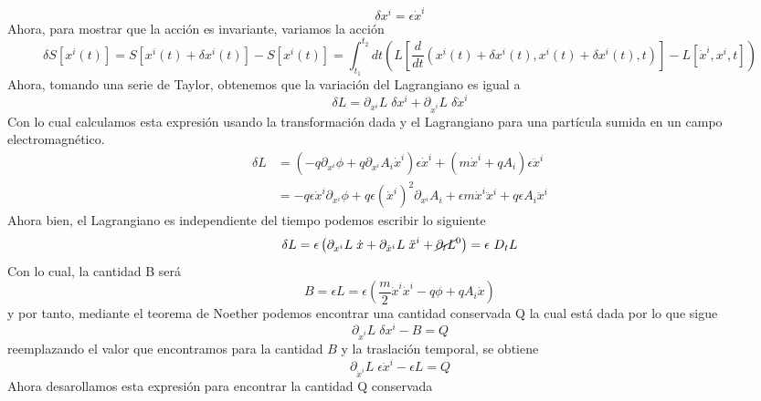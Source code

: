 \documentclass[../main_ej.tex]{subfiles}
\begin{document}
\begin{equation}
  \delta x^i = \epsilon \dot{x}^i 
\end{equation}
Ahora, para mostrar que la acción es invariante, variamos la acción
\begin{equation}
  \delta S[x^i(t)] = S[x^i(t) + \delta x^i(t)] - S[x^i(t)] = \int_{t_1}^{t_2} dt \left(L\left[\frac{d}{dt}(x^i(t)+\delta x^i(t), x^i(t)+\delta x^i(t),t)\right] - L[\dot{x}^i, x^i ,t] \right)
\end{equation}
Ahora, tomando una serie de Taylor, obtenemos que la variación del Lagrangiano es igual a
\begin{equation}
  \delta L = \partial_{x^i}L \;\delta x^i + \partial_{\dot{x}^i} L \; \delta \dot{x}^i
\end{equation}
Con lo cual calculamos esta expresión usando la transformación dada y el Lagrangiano para una partícula sumida en un campo electromagnético.
\begin{align*}
  \delta L  & = \left( -q\partial_{x^i}\phi +q\partial_{x^i}A_i \dot{x}^i \right)\epsilon \dot{x}^i + \left( m\dot{x}^i + qA_i \right)\epsilon\ddot{x}^i \\
  & = -q\epsilon \dot{x}^i\partial_{x^i}\phi + q\epsilon (\dot{x}^i)^2\partial_{x^i}A_i + \epsilon m \dot{x}^i \ddot{x}^i + q \epsilon A_i \ddot{x}^i 
\end{align*}
Ahora bien, el Lagrangiano es independiente del tiempo podemos escribir lo siguiente
\begin{equation*}
  \delta L = \epsilon\left(\partial_{x^i}L \; \dot{x}  + \partial_{\dot{x}^i}L \; \ddot{x}^i + \cancel{\partial_t L }^0\right) = \epsilon\ D_t L
\end{equation*}
Con lo cual, la cantidad B será
\begin{equation*}
  B = \epsilon L = \epsilon \left( \frac{m}{2}\dot{x}^i\dot{x}^i - q\phi + qA_i \dot{x} \right)
\end{equation*}
y por tanto, mediante el teorema de Noether podemos encontrar una cantidad conservada Q la cual está dada por lo que sigue
\begin{equation*}
  \partial_{\dot{x}^i}L \; \delta x^i - B = Q 
\end{equation*}
reemplazando el valor que encontramos para la cantidad $B$  y la traslación temporal, se obtiene 
\begin{equation}
  \partial_{\dot{x}^i} L \; \epsilon \dot{x}^i  - \epsilon L = Q
\end{equation}
Ahora desarollamos esta expresión para encontrar la cantidad Q conservada
\end{document}
